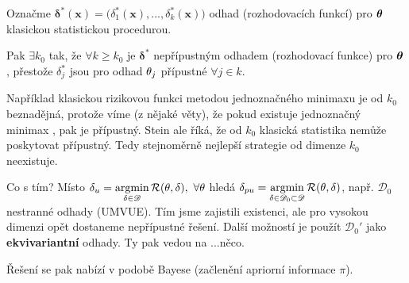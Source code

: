 Označme $\boldsymbol{\delta}^\ast(\textbf{x})=\big(\delta_1^\ast(\textbf{x}),...,\delta_k^\ast(\textbf{x})\big)$ odhad (rozhodovacích funkcí) pro $\boldsymbol{\theta}$ klasickou statistickou procedurou. 

Pak $\exists k_0$ tak, že $\forall k\geq k_0$ je $\boldsymbol{\delta}^\ast$ nepřípustným odhadem (rozhodovací funkce) pro $\boldsymbol{\theta}$, přestože $\delta_j^\ast$ jsou pro odhad $\theta_j$ přípustné $\forall j\in\widehat{k}$.
\begin{dusl}
	Například klasickou rizikovou funkci metodou jednoznačného minimaxu je od $k_0$ beznadějná, protože víme (z nějaké věty), že pokud existuje jednoznačný minimax , pak je přípustný. Stein ale říká, že od $k_0$ klasická statistika nemůže poskytovat přípustný. Tedy stejnoměrně nejlepší strategie od dimenze $k_0$ neexistuje.
\end{dusl}
Co s tím? Místo $\delta_u=\mathop{\mathrm{argmin}}\limits_{\delta\in\mathscr{D}}\mathcal{R}(\theta,\delta),~\forall\theta$ hledá $\delta_{pu}=\mathop{\mathrm{argmin}}\limits_{\delta\in\mathscr{D}_0\subset\mathscr{D}}\mathcal{R}(\theta,\delta)$, např. $\mathscr{D}_0$ nestranné odhady (UMVUE). Tím jsme zajistili existenci, ale pro vysokou dimenzi opět dostaneme nepřípustné řešení. Další možností je použít $\mathscr{D}_0'$ jako \textbf{ekvivariantní} odhady. Ty pak vedou na ...něco.

Řešení se pak nabízí v podobě Bayese (začlenění apriorní informace $\pi$).

